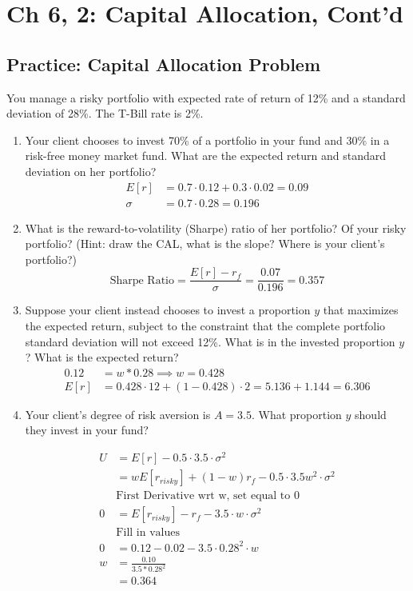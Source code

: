 \documentclass[11pt]{article}
\theoremstyle{definition}
\begin{document}
\section{ Ch 6, 2: Capital Allocation, Cont'd}   

    \begin{shaded}
    \subsection{Practice: Capital Allocation Problem}
    You manage a risky portfolio with expected rate of return of 12\% and a standard deviation of 28\%.  The T-Bill rate is 2\%.
    \begin{enumerate}
        \item Your client chooses to invest 70\% of a portfolio in your fund and 30\% in a risk-free money 
        market fund.   What are the expected return and standard deviation on her portfolio?
        \begin{align*}
            E[r] &= 0.7 \cdot 0.12 + 0.3 \cdot 0.02 = 0.09 \\
            \sigma &= 0.7 \cdot 0.28  = 0.196
        \end{align*}
        \item What is the reward-to-volatility (Sharpe) ratio of her portfolio?   Of your risky portfolio?   (Hint: draw the CAL, what is the slope?  Where is your client's portfolio?)\\
        $$\text{Sharpe Ratio} = \frac{E[r] - r_f}{\sigma} = \frac{0.07}{0.196} = 0.357$$
        \item Suppose your client instead chooses to invest a proportion $y$ that maximizes the expected return, 
        subject to the constraint that the complete portfolio standard deviation will not exceed 12\%.   What is in the invested proportion $y$?   What is the expected return?
        \begin{align*}
            0.12 &= w*0.28 \implies w=0.428 \\
            E[r] &= 0.428 \cdot 12 + (1-0.428) \cdot 2 = 5.136 + 1.144 = 6.306
        \end{align*}
        \item Your client's degree of risk aversion is $A = 3.5$.   What proportion $y$ should they invest in your fund?

        \begin{align*}
            U &= E[r] - 0.5 \cdot 3.5 \cdot \sigma^2 \\
              &= wE[r_{risky}] + (1-w)r_f - 0.5 \cdot 3.5 w^2\cdot \sigma^2 \\
            &\text{First Derivative wrt w, set equal to 0} \\
             0 &= E[r_{risky}] - r_f - 3.5 \cdot w \cdot \sigma^2 \\
            &\text{Fill in values}\\
             0 &= 0.12 - 0.02 - 3.5 \cdot 0.28^2 \cdot w \\
             w &= \frac{0.10}{3.5*0.28^2}\\
             &= 0.364
        \end{align*}
        

\end{enumerate}
\end{shaded}
\end{document}
